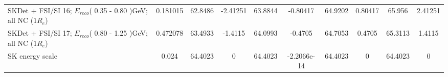\begin{tabular}{| l | S | S  S | S  S | S  S | S  S | }
              SKDet + FSI/SI 16; $E_{reco}$( 0.35 - 0.80 )GeV; all NC ($1R_{e}$) &        0.181015 &         62.8486 &        -2.41251 &         63.8844 &        -0.80417 &         64.9202 &         0.80417 &          65.956 &         2.41251 \\ 
              SKDet + FSI/SI 17; $E_{reco}$( 0.80 - 1.25 )GeV; all NC ($1R_{e}$) &        0.472078 &         63.4933 &         -1.4115 &         64.0993 &         -0.4705 &         64.7053 &          0.4705 &         65.3113 &          1.4115 \\ 
                                                                 SK energy scale &           0.024 &         64.4023 &               0 &         64.4023 &     -2.2066e-14 &         64.4023 &               0 &         64.4023 &               0 \\ 
\bottomrule
\end{tabular}
